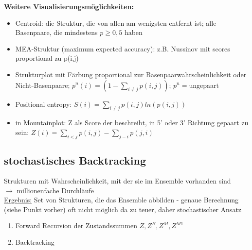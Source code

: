 \textbf{Weitere Visualisierungsmöglichkeiten:}
\begin{itemize}
	\item Centroid: die Struktur, die von allen am wenigsten entfernt ist; alle Basenpaare, die mindestens $p \geq 0,5$ haben
	\item MEA-Struktur (maximum expected accuracy): z.B. Nussinov mit scores proportional zu p(i,j)
	\item Strukturplot mit Färbung proportional zur Basenpaarwahrscheinlichkeit oder Nicht-Basenpaare; $p^n(i)=(1- \sum \limits_{i \neq j} p(i,j))$; $p^n=$ungepaart
	\item Positional entropy: $S(i)=\sum \limits_{i \neq j} p(i,j)ln(p(i,j))$
	\item in Mountainplot: Z als Score der beschreibt, in 5' oder 3' Richtung gepaart zu sein: $Z(i)=\sum \limits_{i<j}p(i,j) - \sum \limits_{j-i}p(j,i)$
\end{itemize}

\newpage

\subsection{stochastisches Backtracking}
Strukturen mit Wahrscheinlichkeit, mit der sie im Ensemble vorhanden sind\\
$\rightarrow$ millionenfache Durchläufe\\
\underline{Ergebnis:} Set von Strukturen, die das Ensemble abbilden
 - genaue Berechnung (siehe Punkt vorher) oft nicht möglich da zu teuer, daher stochastischer Ansatz
 
\begin{enumerate}
	\item Forward Recursion der Zustandssummen $Z, Z^B, Z^M, Z^{M1}$
	\item Backtracking
\end{enumerate}

